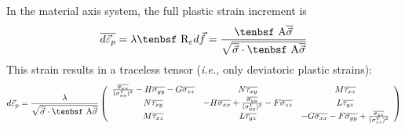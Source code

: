 \documentclass[11pt]{article}
\def\A{\hbox{\tenbsf A}}
\def\dpl{d \vec{\varepsilon}_{p}}
\def\df{d \vec{f}}
\def\R{\hbox{\tenbsf R}}
\def\s#1{\sigma_{#1}}
\def\t#1{\tau_{#1}}
\begin{document}
In the material axis system, the full plastic strain increment is
\begin{equation}
       \overline{\dpl} = \lambda \R_\varepsilon\df = {\A \overline{\vec\s{}}\over\sqrt{\overline{\vec\s{}} \cdot \A \overline{\vec\s{}}}}
\end{equation}
This strain results in a traceless tensor ({\em i.e.}, only deviatoric plastic strains):
\begin{equation}
         \dpl = {\lambda\over \sqrt{\overline{\vec\s{}} \cdot \A \overline{\vec\s{}}}}
         \left( \begin{array}{ccc}
                      {\overline{\s{xx}}\over (\s{xx}^Y)^2} - H\overline{\s{yy}} - G\overline{\s{zz}} & N\overline{\t{xy}} & M\overline{\t{xz}} \\
                       N\overline{\t{xy}} & -H\overline{\s{xx}} + {\overline{\s{yy}}\over (\s{yy}^Y)^2} - F\overline{\s{zz}} & L\overline{\t{yz}}  \\
                       M\overline{\t{xz}} & L\overline{\t{yz}} & -G\overline{\s{xx}} -F\overline{\s{yy}} +{\overline{\s{zz}}\over (\s{zz}^Y)^2} 
                        \end{array} \right)
\end{equation}
\end{document}
